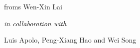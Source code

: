 \documentclass[10pt]{article}
\renewenvironment{frame}[1]%
	{\section*{#1}}%
	{\clearpage}
\begin{document}
\begin{frame}{}

\centering

\huge
{}
\bigskip

\large
froms Wen-Xin Lai\ 

\textit{\normalsize in collaboration with}

	Luis Apolo,
	Peng-Xiang Hao 
	and Wei Song \\[2ex]

\end{frame}




\begin{frame}{}
\renewcommand*{\bibfont}{\footnotesize}
\printbibliography %
\end{frame}
\end{document}
